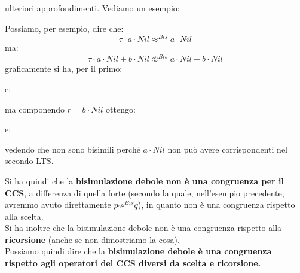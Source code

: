 ulteriori approfondimenti. Vediamo un esempio:
\begin{esempio}
  Possiamo, per esempio, dire che:
  \[\tau\cdot a\cdot Nil\approx^{Bis}a\cdot Nil\]
  ma:
  \[\tau\cdot a\cdot Nil+b\cdot Nil\not\approx^{Bis}a\cdot Nil+b\cdot Nil\]
  graficamente si ha, per il primo:
  \begin{center}
  \end{center}
  e:
  \begin{center}
  \end{center}
  ma componendo $r=b\cdot Nil$ ottengo:
  \begin{center}
  \end{center}
  e:
  \begin{center}
  \end{center}
  vedendo che non sono bisimili perché $a\cdot Nil$ non può avere corrispondenti
  nel secondo LTS.
\end{esempio}
Si ha quindi che la \textbf{bisimulazione debole non è una congruenza per il
  CCS}, a differenza di quella forte (secondo la quale, nell'esempio precedente,
avremmo avuto direttamente $p\not\sim^{Bis}q$), in quanto non è una congruenza
rispetto alla scelta.\\
Si ha inoltre che la bisimulazione debole non è una congruenza rispetto alla
\textbf{ricorsione} (anche se non dimostriamo la cosa).\\
Possiamo quindi dire che la \textbf{bisimulazione debole è una congruenza
  rispetto agli operatori del CCS diversi da scelta e ricorsione.}\\
